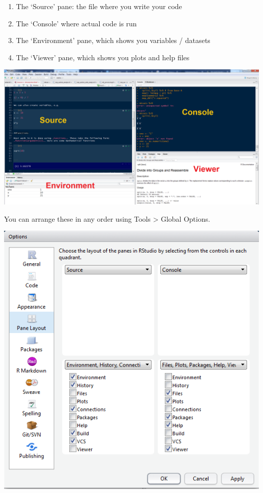 \documentclass[]{article}
\providecommand{\tightlist}{%
  \setlength{\itemsep}{0pt}\setlength{\parskip}{0pt}}
\begin{document}
\begin{enumerate}
\def\labelenumi{\arabic{enumi}.}
\tightlist
\item
  The `Source' pane: the file where you write your code
\item
  The `Console' where actual code is run
\item
  The `Environment' pane, which shows you variables / datasets
\item
  The `Viewer' pane, which shows you plots and help files
\end{enumerate}

\includegraphics{console_etc.png}

You can arrange these in any order using Tools \textgreater{} Global
Options.

\includegraphics{panes.png}
\end{document}

